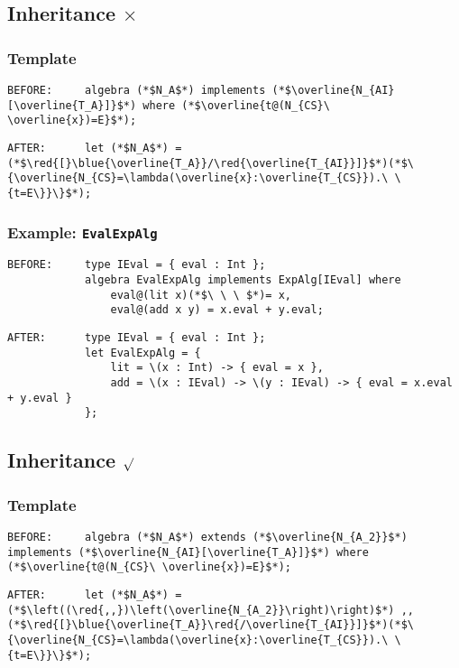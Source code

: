 \documentclass{article}
\newcommand{\red}[1]{\textcolor{red}{#1}}
\newcommand{\blue}[1]{\textcolor{blue}{#1}}
\begin{document}
\begin{spacing}{1.1}
\subsection{Inheritance $\times$}

\subsubsection{Template}

\begin{lstlisting}[numbers=none]
BEFORE:     algebra (*$N_A$*) implements (*$\overline{N_{AI}[\overline{T_A}]}$*) where (*$\overline{t@(N_{CS}\ \overline{x})=E}$*);
\end{lstlisting}
\begin{lstlisting}[numbers=none]
AFTER:      let (*$N_A$*) = (*$\red{[}\blue{\overline{T_A}}/\red{\overline{T_{AI}}]}$*)(*$\{\overline{N_{CS}=\lambda(\overline{x}:\overline{T_{CS}}).\ \{t=E\}}\}$*);
\end{lstlisting}

\subsubsection{Example: \lstinline{EvalExpAlg}}

\begin{lstlisting}[numbers=none]
BEFORE:     type IEval = { eval : Int };
            algebra EvalExpAlg implements ExpAlg[IEval] where
                eval@(lit x)(*$\ \ \ $*)= x,
                eval@(add x y) = x.eval + y.eval;
\end{lstlisting}
\begin{lstlisting}[numbers=none]
AFTER:      type IEval = { eval : Int };
            let EvalExpAlg = {
                lit = \(x : Int) -> { eval = x },
                add = \(x : IEval) -> \(y : IEval) -> { eval = x.eval + y.eval }
            };
\end{lstlisting}

\subsection{Inheritance $\surd$}

\subsubsection{Template}

\begin{lstlisting}[numbers=none]
BEFORE:     algebra (*$N_A$*) extends (*$\overline{N_{A_2}}$*) implements (*$\overline{N_{AI}[\overline{T_A}]}$*) where (*$\overline{t@(N_{CS}\ \overline{x})=E}$*);
\end{lstlisting}
\begin{lstlisting}[numbers=none]
AFTER:      let (*$N_A$*) =  (*$\left((\red{,,})\left(\overline{N_{A_2}}\right)\right)$*) ,, (*$\red{[}\blue{\overline{T_A}}\red{/\overline{T_{AI}}]}$*)(*$\{\overline{N_{CS}=\lambda(\overline{x}:\overline{T_{CS}}).\ \{t=E\}}\}$*);
\end{lstlisting}


\end{spacing}
\end{document}
